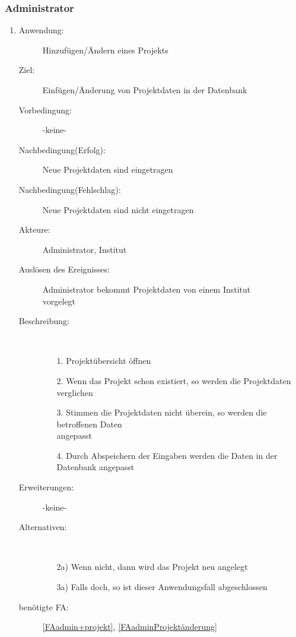 \documentclass[parskip=full]{scrartcl}
\newcommand{\swtLabel}[1]{\textbf{/#1\arabic*0/}}
\begin{document}
\begin{enumerate} [label=\swtLabel{B}]
\end{enumerate}


\subsubsection{Administrator}
\begin{enumerate} [label=\swtLabel{A}]
  \item
    \begin{description}
  	\item[Anwendung:] Hinzufügen/Ändern eines Projekts
  	\item[Ziel:] Einfügen/Änderung von Projektdaten in der Datenbank
  	\item[Vorbedingung:] -keine-
  	\item[Nachbedingung(Erfolg):] Neue Projektdaten sind eingetragen
  	\item[Nachbedingung(Fehlschlag):] Neue Projektdaten sind nicht eingetragen
  	\item[Akteure:] Administrator, Institut
  	\item[Auslösen des Ereignisses:] Administrator bekommt Projektdaten von einem
  	Institut\\ vorgelegt
  	\item[Beschreibung:]~
  	\begin{enumerate} 
  	  \item[1.] Projektübersicht öffnen
  	  \item[2.] Wenn das Projekt schon existiert, so werden die Projektdaten
  	  verglichen
  	  \item[3.] Stimmen die Projektdaten nicht überein, so werden die betroffenen
  	  Daten\\ angepasst
  	  \item[4.] Durch Abspeichern der Eingaben werden die Daten in der Datenbank
  	  angepasst
  	\end{enumerate}
  	\item[Erweiterungen:] -keine-
  	\item[Alternativen:]~
  	\begin{enumerate}
  	  \item[2a)] Wenn nicht, dann wird das Projekt neu angelegt
  	  \item[3a)] Falls doch, so ist dieser Anwendungsfall abgeschlossen
  	\end{enumerate} 
  	\item[benötigte FA:] \ref{FAadmin+projekt}, \ref{FAadminProjektänderung}
  \end{description}
   

\end{enumerate}
\end{document}
